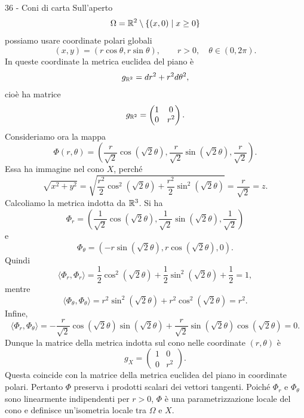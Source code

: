\documentclass[a4paper]{article}
\begin{document}
\begin{snippetsolution}{36 - Coni di carta}
    Sull'aperto
    \[
        \Omega=\mathbb{R}^2\setminus\{(x,0)\mid x\geq0\}
    \]
    possiamo usare coordinate polari globali
    \[
        (x,y)=(r\cos\theta,r\sin\theta),
        \qquad
        r>0,\quad \theta\in(0,2\pi).
    \]
    In queste coordinate la metrica euclidea del piano è
    \[
        g_{\mathbb{R}^2}
        =
        dr^2+r^2d\theta^2,
    \]
    cioè ha matrice
    \[
        g_{\mathbb{R}^2}
        =
        \begin{pmatrix}
            1 & 0\\
            0 & r^2
        \end{pmatrix}.
    \]
    Consideriamo ora la mappa
    \[
        \Phi(r,\theta)
        =
        \left(
            \frac{r}{\sqrt{2}}\cos(\sqrt{2}\theta),
            \frac{r}{\sqrt{2}}\sin(\sqrt{2}\theta),
            \frac{r}{\sqrt{2}}
        \right).
    \]
    Essa ha immagine nel cono \(X\), perché
    \[
        \sqrt{x^2+y^2}
        =
        \sqrt{
            \frac{r^2}{2}\cos^2(\sqrt{2}\theta)
            +
            \frac{r^2}{2}\sin^2(\sqrt{2}\theta)
        }
        =
        \frac{r}{\sqrt{2}}
        =
        z.
    \]
    Calcoliamo la metrica indotta da \(\mathbb{R}^3\). Si ha
    \[
        \Phi_r
        =
        \left(
            \frac{1}{\sqrt{2}}\cos(\sqrt{2}\theta),
            \frac{1}{\sqrt{2}}\sin(\sqrt{2}\theta),
            \frac{1}{\sqrt{2}}
        \right)
    \]
    e
    \[
        \Phi_\theta
        =
        \left(
            -r\sin(\sqrt{2}\theta),
            r\cos(\sqrt{2}\theta),
            0
        \right).
    \]
    Quindi
    \[
        \langle\Phi_r,\Phi_r\rangle
        =
        \frac12\cos^2(\sqrt{2}\theta)
        +
        \frac12\sin^2(\sqrt{2}\theta)
        +
        \frac12
        =
        1,
    \]
    mentre
    \[
        \langle\Phi_\theta,\Phi_\theta\rangle
        =
        r^2\sin^2(\sqrt{2}\theta)
        +
        r^2\cos^2(\sqrt{2}\theta)
        =
        r^2.
    \]
    Infine,
    \[
        \langle\Phi_r,\Phi_\theta\rangle
        =
        -\frac{r}{\sqrt{2}}\cos(\sqrt{2}\theta)\sin(\sqrt{2}\theta)
        +
        \frac{r}{\sqrt{2}}\sin(\sqrt{2}\theta)\cos(\sqrt{2}\theta)
        =
        0.
    \]
    Dunque la matrice della metrica indotta sul cono nelle coordinate \((r,\theta)\) è
    \[
        g_X
        =
        \begin{pmatrix}
            1 & 0\\
            0 & r^2
        \end{pmatrix}.
    \]
    Questa coincide con la matrice della metrica euclidea del piano in coordinate polari. Pertanto \(\Phi\) preserva i prodotti scalari dei vettori tangenti. Poiché \(\Phi_r\) e \(\Phi_\theta\) sono linearmente indipendenti per \(r>0\), \(\Phi\) è una parametrizzazione locale del cono e definisce un'isometria locale tra \(\Omega\) e \(X\).
\end{snippetsolution}
\end{document}
